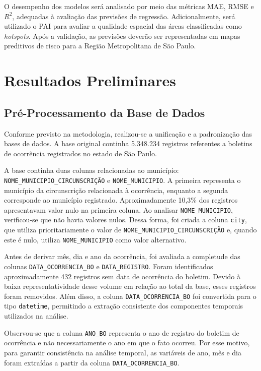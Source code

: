 \documentclass[12pt]{article}
\begin{document}
O desempenho dos modelos será analisado por meio das métricas MAE, RMSE e $R^2$, adequadas à avaliação das previsões de regressão. Adicionalmente, será utilizado o PAI para avaliar a qualidade espacial das áreas classificadas como \textit{hotspots}. Após a validação, as previsões deverão ser representadas em mapas preditivos de risco para a Região Metropolitana de São Paulo.

\vspace{1.2cm}

\section{Resultados Preliminares}

\subsection{Pré-Processamento da Base de Dados}

Conforme previsto na metodologia, realizou-se a unificação e a padronização das bases de dados. A base original continha 5.348.234 registros referentes a boletins de ocorrência registrados no estado de São Paulo.

A base continha duas colunas relacionadas ao município: \texttt{NOME\_MUNICIPIO\_CIRCUNSCRIÇÃO} e \texttt{NOME\_MUNICIPIO}. A primeira representa o município da circunscrição relacionada à ocorrência, enquanto a segunda corresponde ao município registrado. Aproximadamente 10,3\% dos registros apresentavam valor nulo na primeira coluna. Ao analisar \texttt{NOME\_MUNICIPIO}, verificou-se que não havia valores nulos. Dessa forma, foi criada a coluna \texttt{city}, que utiliza prioritariamente o valor de \texttt{NOME\_MUNICIPIO\_CIRCUNSCRIÇÃO} e, quando este é nulo, utiliza \texttt{NOME\_MUNICIPIO} como valor alternativo.

Antes de derivar mês, dia e ano da ocorrência, foi avaliada a completude das colunas \texttt{DATA\_OCORRENCIA\_BO} e \texttt{DATA\_REGISTRO}. Foram identificados aproximadamente 432 registros sem data de ocorrência do boletim. Devido à baixa representatividade desse volume em relação ao total da base, esses registros foram removidos. Além disso, a coluna \texttt{DATA\_OCORRENCIA\_BO} foi convertida para o tipo \texttt{datetime}, permitindo a extração consistente dos componentes temporais utilizados na análise.

Observou-se que a coluna \texttt{ANO\_BO} representa o ano de registro do boletim de ocorrência e não necessariamente o ano em que o fato ocorreu. Por esse motivo, para garantir consistência na análise temporal, as variáveis de ano, mês e dia foram extraídas a partir da coluna \texttt{DATA\_OCORRENCIA\_BO}.
\end{document}
